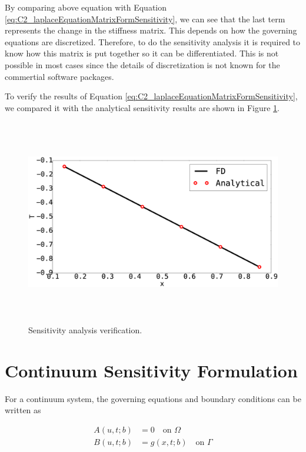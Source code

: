 By comparing above equation with Equation \eqref{eq:C2_laplaceEquationMatrixFormSensitivity}, we can see that the last term represents the change in the stiffness matrix. This depends on how the governing equations are discretized. Therefore, to do the sensitivity analysis it is required to know how this matrix is put together so it can be differentiated. This is not possible in most cases since the details of discretization is not known for the commertial software packages.

To verify the results of Equation \eqref{eq:C2_laplaceEquationMatrixFormSensitivity}, we compared it with the analytical sensitivity results are shown in Figure \ref{fig:C2_discreteSensitivityVerification}.

\begin{figure}
	\centering
	\includegraphics[height=9.00cm]{Chapter_2/figure/SA_finitedifference_vs_analytical.eps}
	\caption{Sensitivity analysis verification.}
	\label{fig:C2_discreteSensitivityVerification}
\end{figure}

\section{Continuum Sensitivity Formulation}
For a continuum system, the governing equations and boundary conditions can be written as

\begin{subequations}\label{eq:C2_continuumGoverningEquation}
\begin{align}
	A(u, t; b) &= 0 \quad \text{on } \Omega \\
	B(u, t; b) &= g(x, t; b) \quad \text{on } \Gamma \\
\end{align}	
\end{subequations}

